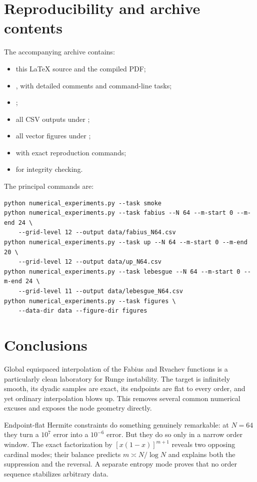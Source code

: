 \documentclass[11pt,oneside]{article}
\numberwithin{equation}{section}
\theoremstyle{definition}
\theoremstyle{remark}
\begin{document}
\section{Reproducibility and archive contents}
\label{sec:reproducibility}

The accompanying archive contains:
\begin{itemize}
\item this LaTeX source and the compiled PDF;
\item {}, with detailed comments and command-line tasks;
\item {};
\item all CSV outputs under ;
\item all vector figures under ;
\item {} with exact reproduction commands;
\item {} for integrity checking.
\end{itemize}

The principal commands are:
\begin{lstlisting}[style=python]
python numerical_experiments.py --task smoke
python numerical_experiments.py --task fabius --N 64 --m-start 0 --m-end 24 \
    --grid-level 12 --output data/fabius_N64.csv
python numerical_experiments.py --task up --N 64 --m-start 0 --m-end 20 \
    --grid-level 12 --output data/up_N64.csv
python numerical_experiments.py --task lebesgue --N 64 --m-start 0 --m-end 24 \
    --grid-level 11 --output data/lebesgue_N64.csv
python numerical_experiments.py --task figures \
    --data-dir data --figure-dir figures
\end{lstlisting}

\section{Conclusions}
\label{sec:conclusion}

Global equispaced interpolation of the Fabius and Rvachev functions is a particularly clean
laboratory for Runge instability.  The target is infinitely smooth, its dyadic samples are
exact, its endpoints are flat to every order, and yet ordinary interpolation blows up.
This removes several common numerical excuses and exposes the node geometry directly.

Endpoint-flat Hermite constraints do something genuinely remarkable: at $N=64$ they turn a
$10^7$ error into a $10^{-6}$ error.  But they do so only in a narrow order window.  The
exact factorization by $[x(1-x)]^{m+1}$ reveals two opposing cardinal modes; their balance
predicts $m\asymp N/\log N$ and explains both the suppression and the reversal.  A separate
entropy mode proves that no order sequence stabilizes arbitrary data.
\end{document}
